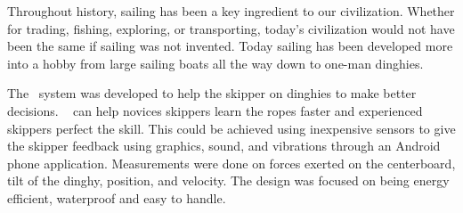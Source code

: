 Throughout history, sailing has been a key ingredient to our civilization. Whether for trading, fishing, exploring, or transporting, today's civilization would not have been the same if sailing was not invented. Today sailing has been developed more into a hobby from large sailing boats all the way down to one-man dinghies. 

The \project~system was developed to help the \gls{skipper} on dinghies to make better decisions. \project~ can help novices \gls{skipper}s learn the ropes faster and experienced skippers perfect the skill.  This could be achieved using inexpensive sensors to give the \gls{skipper} feedback using graphics, sound, and vibrations through an Android phone application. Measurements were done on forces exerted on the centerboard, tilt of the dinghy, position, and velocity. The design was focused on being energy efficient, waterproof and easy to handle.
